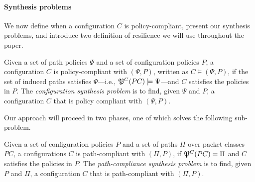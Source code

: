 


\paragraph{Synthesis problems}
\noindent We now define when a configuration $C$ is policy-compliant, present our synthesis problems, and introduce two definition of resilience we will use throughout the paper.
\begin{definition} \label{def:policycompliance}
	Given a set of path policies $\Psi$ and a set of configuration policies $P$,
	a configuration $C$ is policy-compliant with $(\Psi,P)$,  
	written as $C \models (\Psi,P)$, if the set of
	induced paths satisfies $\Psi$---i.e., $\mathfrak{P}^C(PC) \models \Psi$---and $C$ satisfies the policies in $P$.
	The \emph{configuration synthesis problem} is to find, given $\Psi$ and $P$,
a configuration $C$ that is policy compliant with $(\Psi,P)$.
\end{definition}

Our approach will proceed in two phases,
one of which solves the following sub-problem.  
\begin{definition} \label{def:pathcompliance}
Given a set of configuration policies $P$
and a set of paths $\Pi$ over packet classes $PC$,
	a configurations $C$ is path-compliant with 
	$(\Pi,P)$,
	if $\mathfrak{P}^C(PC)=\Pi$ and $C$ satisfies the policies in $P$.
	The \emph{path-compliance synthesis problem} is to find, given $P$ and $\Pi$,
a configuration $C$ that is path-compliant with $(\Pi,P)$.
\end{definition}

